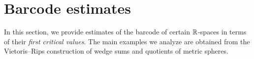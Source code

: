 
\section{Barcode estimates}\label{s:computations}

In this section, we provide estimates of the barcode of certain $\mathbb{R}$-spaces in terms of their \textit{first critical values}.
The main examples we analyze are obtained from the Vietoris--Rips construction of wedge sums and quotients of metric spheres.




